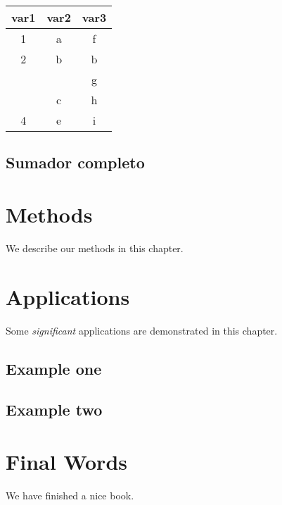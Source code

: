 \documentclass[
]{book}
\begin{document}
\begin{table}
\centering
\begin{tabular}{c|c|c}
\hline
var1 & var2 & var3\\
\hline
1 & a & f\\
\cline{1-3}
2 & b & b\\
\cline{1-3}
 &  & g\\
\cline{3-3}
\multirow{-2}{*}{\centering\arraybackslash 3} & \multirow{-2}{*}{\centering\arraybackslash c} & h\\
\cline{1-3}
4 & e & i\\
\hline
\end{tabular}
\end{table}

\hypertarget{sumador-completo}{%
\section{Sumador completo}\label{sumador-completo}}

\hypertarget{methods}{%
\chapter{Methods}\label{methods}}

We describe our methods in this chapter.

\hypertarget{applications}{%
\chapter{Applications}\label{applications}}

Some \emph{significant} applications are demonstrated in this chapter.

\hypertarget{example-one}{%
\section{Example one}\label{example-one}}

\hypertarget{example-two}{%
\section{Example two}\label{example-two}}

\hypertarget{final-words}{%
\chapter{Final Words}\label{final-words}}

We have finished a nice book.

  
\end{document}

